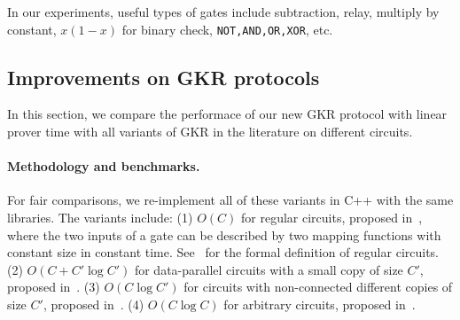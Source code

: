 In our experiments, useful types of gates include subtraction, relay, multiply by constant, $x(1-x)$ for binary check, \texttt{NOT,AND,OR,XOR}, etc. 



\subsection{Improvements on GKR protocols}\label{subsec:expGKR}

In this section, we compare the performace of our new GKR protocol with linear prover time with all variants of GKR in the literature on different circuits.

\paragraph{Methodology and benchmarks.} For fair comparisons, we re-implement all of these variants in C++ with the same libraries. The variants include: (1) $O(C)$ for regular circuits, proposed in~\cite{JT_Thesis}, where the two inputs of a gate can be described by two mapping functions with constant size in constant time. See~\cite{JT_Thesis} for the formal definition of regular circuits. (2) $O(C+C'\log C')$ for data-parallel circuits with a small copy of size $C'$, proposed in~\cite{wahby2017full}. (3) $O(C\log C')$ for circuits with non-connected different copies of size $C'$, proposed in~\cite{vram}. (4) $O(C\log C)$ for arbitrary circuits, proposed in~\cite{CMT}.

